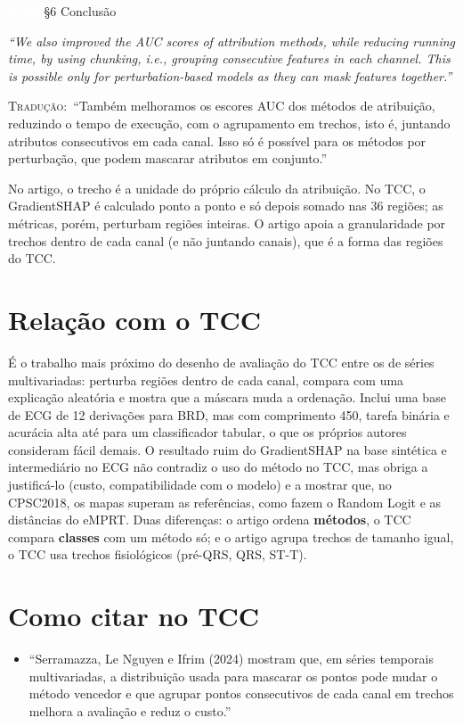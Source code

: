 \documentclass[11pt,a4paper]{article}
\newcommand{\pagechip}[1]{{\setlength{\fboxsep}{1.5pt}\colorbox{cAcc}{\textcolor{white}{\scriptsize\texttt{#1}}}}}
\newenvironment{origquote}{\par\itshape\small}{\par}
\newenvironment{tradquote}{\par\small\textsc{Tradução:}\ }{\par}
\newcommand{\explab}[1]{\par\smallskip{\small\color{cAcc}\textbf{\MakeUppercase{#1}}}\par}
\begin{document}
\begin{citacard}{\pagechip{p. 16} §6 Conclusão}
\begin{origquote}“We also improved the AUC scores of attribution methods, while reducing running time, by using chunking, i.e., grouping consecutive features in each channel. This is possible only for perturbation-based models as they can mask features together.”\end{origquote}
\begin{tradquote}“Também melhoramos os escores AUC dos métodos de atribuição, reduzindo o tempo de execução, com o agrupamento em trechos, isto é, juntando atributos consecutivos em cada canal. Isso só é possível para os métodos por perturbação, que podem mascarar atributos em conjunto.”\end{tradquote}
\explab{Explicação}
No artigo, o trecho é a unidade do próprio cálculo da atribuição. No TCC, o GradientSHAP é calculado ponto a ponto e só depois somado nas 36 regiões; as métricas, porém, perturbam regiões inteiras. O artigo apoia a granularidade por trechos dentro de cada canal (e não juntando canais), que é a forma das regiões do TCC.
\end{citacard}

\section{Relação com o TCC}
É o trabalho mais próximo do desenho de avaliação do TCC entre os de séries multivariadas: perturba regiões dentro de cada canal, compara com uma explicação aleatória e mostra que a máscara muda a ordenação. Inclui uma base de ECG de 12 derivações para BRD, mas com comprimento 450, tarefa binária e acurácia alta até para um classificador tabular, o que os próprios autores consideram fácil demais. O resultado ruim do GradientSHAP na base sintética e intermediário no ECG não contradiz o uso do método no TCC, mas obriga a justificá-lo (custo, compatibilidade com o modelo) e a mostrar que, no CPSC2018, os mapas superam as referências, como fazem o Random Logit e as distâncias do eMPRT. Duas diferenças: o artigo ordena \textbf{métodos}, o TCC compara \textbf{classes} com um método só; e o artigo agrupa trechos de tamanho igual, o TCC usa trechos fisiológicos (pré-QRS, QRS, ST-T).

\section{Como citar no TCC}
\begin{itemize}
\item ``Serramazza, Le Nguyen e Ifrim (2024) mostram que, em séries temporais multivariadas, a distribuição usada para mascarar os pontos pode mudar o método vencedor e que agrupar pontos consecutivos de cada canal em trechos melhora a avaliação e reduz o custo.''
\end{itemize}
\end{document}
